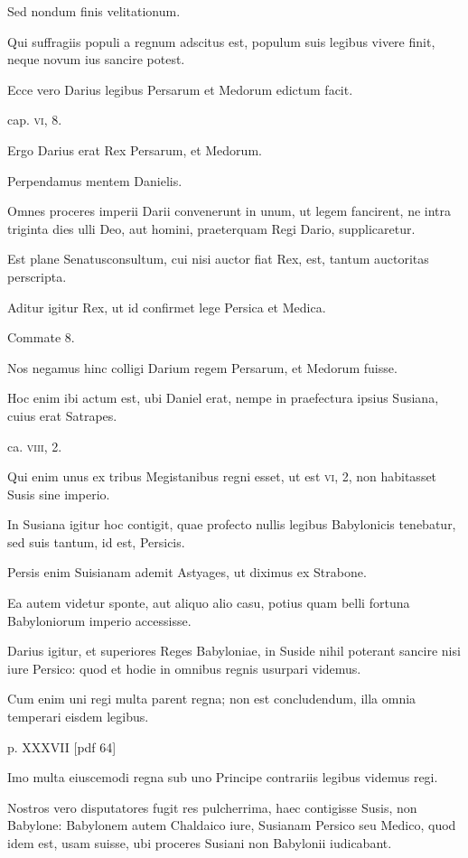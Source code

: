 \begin{parnumbers}
Sed nondum
finis velitationum.

Qui suffragiis populi a regnum adscitus est,
populum suis legibus vivere finit, neque novum ius sancire potest.

Ecce vero Darius legibus Persarum et Medorum edictum facit.

cap. \textsc{vi}, 8.

Ergo Darius erat Rex Persarum, et Medorum.

Perpendamus
mentem Danielis.

Omnes proceres imperii Darii convenerunt
in unum, ut legem fancirent, ne intra triginta dies ulli
Deo, aut homini, praeterquam Regi Dario, supplicaretur.

Est plane
Senatusconsultum, cui nisi auctor fiat Rex, est, tantum auctoritas
perscripta.

Aditur igitur Rex, ut id confirmet lege Persica et
Medica.

Commate 8.

Nos negamus hinc colligi Darium regem
Persarum, et Medorum fuisse.

Hoc enim ibi actum est, ubi Daniel
erat, nempe in praefectura ipsius Susiana, cuius erat Satrapes.

ca. \textsc{viii}, 2.

Qui enim unus ex tribus Megistanibus regni esset, ut est
\textsc{vi}, 2, non habitasset Susis sine imperio.

In Susiana igitur hoc contigit,
quae profecto nullis legibus Babylonicis tenebatur, sed suis
tantum, id est, Persicis.

Persis enim Suisianam ademit Astyages, ut
diximus ex Strabone.

Ea autem videtur sponte, aut aliquo alio casu,
potius quam belli fortuna Babyloniorum imperio accessisse.

Darius igitur, et superiores Reges Babyloniae, in Suside nihil poterant
sancire nisi iure Persico: quod et hodie in omnibus regnis usurpari
videmus.

Cum enim uni regi multa parent regna; non est concludendum,
illa omnia temperari eisdem legibus.

\clearpage
p. XXXVII [pdf 64]

Imo multa eiuscemodi regna sub uno Principe contrariis legibus videmus regi.

Nostros vero disputatores fugit res pulcherrima, haec contigisse
Susis, non Babylone: Babylonem autem Chaldaico iure, Susianam
Persico seu Medico, quod idem est, usam suisse, ubi proceres Susiani
non Babylonii iudicabant.


\end{parnumbers}
